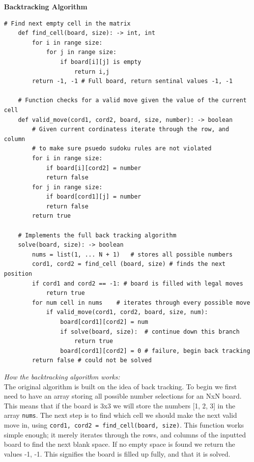 \documentclass{article}
\begin{document}
\bigskip

\bigskip

\bigskip

\bigskip

\noindent \textbf{Backtracking Algorithm}

\begin{lstlisting}[frame=single]
	# Find next empty cell in the matrix
	def find_cell(board, size): -> int, int
		for i in range size:
			for j in range size:
				if board[i][j] is empty
					return i,j 
		return -1, -1 # Full board, return sentinal values -1, -1

	# Function checks for a valid move given the value of the current cell
	def valid_move(cord1, cord2, board, size, number): -> boolean
		# Given current cordinatess iterate through the row, and column
		# to make sure psuedo sudoku rules are not violated
		for i in range size:
			if board[i][cord2] = number 
			return false
		for j in range size:
			if board[cord1][j] = number
			return false
		return true
	
	# Implements the full back tracking algorithm
	solve(board, size): -> boolean
		nums = list(1, ... N + 1)	# stores all possible numbers
		cord1, cord2 = find_cell (board, size) # finds the next position
		if cord1 and cord2 == -1: # board is filled with legal moves
			return true
		for num cell in nums	# iterates through every possible move
			if valid_move(cord1, cord2, board, size, num):
				board[cord1][cord2] = num
				if solve(board, size):	# continue down this branch
					return true
				board[cord1][cord2] = 0	# failure, begin back tracking
		return false # could not be solved
\end{lstlisting}

\textit{How the backtracking algorithm works:} \\

\medskip
	The original algorithm is built on the idea of back tracking. To begin we first
	need to have an array storing all possible number selections for an NxN board. This means that
	if the board is 3x3 we will store the numbers [1, 2, 3] in the array \verb|nums|. The next step is to find which cell we should
	make the next valid move in, using \verb|cord1, cord2 = find_cell(board, size)|. This function works simple enough;
	it merely iterates through the rows, and columns of the inputted board to find the next blank space. 
	If no empty space is found we return the values -1, -1. This signifies the board is filled up fully, and that it is solved.
\end{document}
